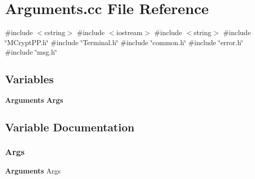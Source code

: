 \section{Arguments.\+cc File Reference}
\label{Arguments_8cc}
{\ttfamily \#include $<$cstring$>$}\newline
{\ttfamily \#include $<$iostream$>$}\newline
{\ttfamily \#include $<$string$>$}\newline
{\ttfamily \#include \char`\"{}M\+Crypt\+P\+P.\+h\char`\"{}}\newline
{\ttfamily \#include \char`\"{}Terminal.\+h\char`\"{}}\newline
{\ttfamily \#include \char`\"{}common.\+h\char`\"{}}\newline
{\ttfamily \#include \char`\"{}error.\+h\char`\"{}}\newline
{\ttfamily \#include \char`\"{}msg.\+h\char`\"{}}\newline
\subsection*{Variables}
\begin{DoxyCompactItemize}
\item 
\textbf{ Arguments} \textbf{ Args}
\end{DoxyCompactItemize}


\subsection{Variable Documentation}
\mbox{\label{Arguments_8cc_a7d9e0086268ae4469cc7256b4e3003cc}} 
\subsubsection{Args}
{\footnotesize\ttfamily \textbf{ Arguments} Args}

